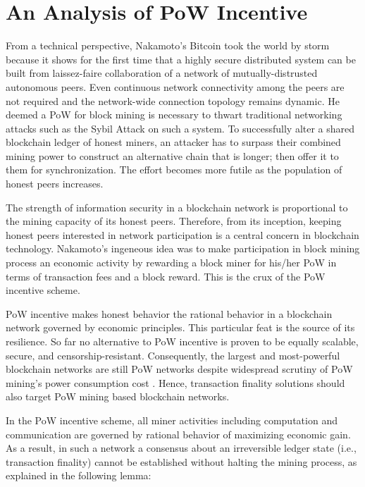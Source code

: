 \section{An Analysis of PoW Incentive}
\label{s-incentive}
From a technical perspective, Nakamoto's Bitcoin \cite{bitcoin} took the world by storm because it shows for the first time that a highly secure distributed system can be built from laissez-faire collaboration of a network of mutually-distrusted autonomous peers. Even continuous network connectivity among the peers are not required and the network-wide connection topology remains dynamic. He deemed a PoW for block mining is necessary to thwart traditional networking attacks such as the Sybil Attack \cite{Douceur:2002:SA:646334.687813} on such a system. To successfully alter a shared blockchain ledger of honest miners, an attacker has to surpass their combined mining power to construct an alternative chain that is longer; then offer it to them for synchronization. The effort becomes more futile as the population of honest peers increases.

The strength of information security in a blockchain network is proportional to the mining capacity of its honest peers. Therefore, from its inception, keeping honest peers interested in network participation is a central concern in blockchain technology. Nakamoto's ingeneous idea was to make participation in block mining process an economic activity \cite{Kroll2013TheEO} by rewarding a block miner for his/her PoW in terms of transaction fees and a block reward. This is the crux of the PoW incentive scheme.

PoW incentive makes honest behavior the rational behavior \cite{bitcoin} in a blockchain network governed by economic principles. This particular feat is the source of its resilience. So far no alternative to PoW incentive is proven to be equally scalable, secure, and censorship-resistant. Consequently, the largest and most-powerful blockchain networks are still PoW networks despite widespread scrutiny of PoW mining's power consumption cost \cite{powcost}. Hence, transaction finality solutions should also target PoW mining based blockchain networks.

In the PoW incentive scheme, all miner activities including computation and communication are governed by rational behavior of maximizing economic gain. As a result, in such a network a consensus about an irreversible ledger state (i.e., transaction finality) cannot be established without halting the mining process, as explained in the following lemma:

